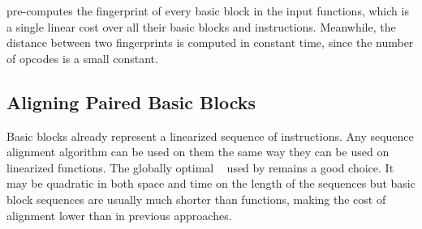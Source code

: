 {\ProjName} pre-computes the fingerprint of every basic block in the input functions, which is a single linear cost over all their basic blocks and instructions.
Meanwhile, the distance between two fingerprints is computed in constant time, since the number of opcodes is a small constant.










\subsection{Aligning Paired Basic Blocks}
\label{sec:bb-alignment}


\label{sec:nw-alignment}

Basic blocks already represent a linearized sequence of instructions.
Any sequence alignment algorithm can be used on them the same way they can be used on linearized functions. The globally optimal \NW~\cite{needleman70} used by {\SOAName} remains a good choice. It may be quadratic in both space and time on the length of the sequences but basic block sequences are usually much shorter than functions, making the cost of alignment lower than in previous approaches. 

